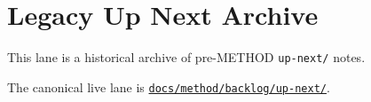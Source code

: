 \chapter{Legacy Up Next Archive}\label{record-391}

\smallskip

This lane is a historical archive of pre-METHOD \texttt{u\allowbreak{}p\allowbreak{}-\allowbreak{}n\allowbreak{}e\allowbreak{}x\allowbreak{}t\allowbreak{}/} notes.

The canonical live lane is \href{https://github.com/flyingrobots/bijou/blob/cbd70612140e7a450d764b3c7be1c6af878b99bc/docs/method/graveyard/method/backlog/up-next/README.md}{\texttt{d\allowbreak{}o\allowbreak{}c\allowbreak{}s\allowbreak{}/\allowbreak{}m\allowbreak{}e\allowbreak{}t\allowbreak{}h\allowbreak{}o\allowbreak{}d\allowbreak{}/\allowbreak{}b\allowbreak{}a\allowbreak{}c\allowbreak{}k\allowbreak{}l\allowbreak{}o\allowbreak{}g\allowbreak{}/\allowbreak{}u\allowbreak{}p\allowbreak{}-\allowbreak{}n\allowbreak{}e\allowbreak{}x\allowbreak{}t\allowbreak{}/}}.

